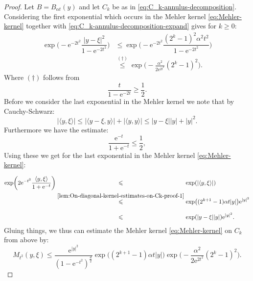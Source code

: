 \documentclass[a4paper,oneside,10pt]{amsproc}
\theoremstyle{remark}
\newcommand{\la}{\langle}
\newcommand{\ra}{\rangle}
\renewcommand{\leq}{\leqslant}
\renewcommand{\leq}{\leqslant}
\renewcommand{\geq}{\geqslant}
\newcommand{\e}{\mathrm{e}} %
\renewcommand{\leq}{\leqslant}%
\renewcommand{\geq}{\geqslant}%
\begin{document}
\begin{proof}
  Let $B = B_{\alpha t}(y)$ and let $C_k$ be as in
  \eqref{eq:C_k-annulus-decomposition}. Considering the first
  exponential which occurs in the Mehler kernel
  \eqref{eq:Mehler-kernel} together with
  \eqref{eq:C_k-annulus-decomposition-expand} gives for $k \geq 0$:
  \begin{align*}
    \exp\biggl(-\e^{-2t^2} \dfrac{|y - \xi|^2}{1 - \e^{-2t^2}} \biggr)
    &\leq \exp\biggl(-\e^{-2t^2} \dfrac{(2^k - 1)^2 \alpha^2 t^2}{1 - \e^{-2t^2}} \biggr)\\
    &\overset{(\dagger)}{\leq} \exp\biggl(-\frac{\alpha^2}{2 \e^{2t^2}} (2^k - 1)^2 \biggr).
  \end{align*}
  Where $(\dagger)$ follows from
  \begin{equation*}
    \frac{t}{1 - \e^{-2t}} \geq \frac12.
  \end{equation*}
  Before we consider the last exponential in the Mehler kernel we note
  that by Cauchy-Schwarz:
  \begin{equation}
    \label{lem:On-diagonal-kernel-estimates-on-Ck-proof-1}
    |\langle y, \xi \rangle| \leq |\la y - \xi, y \ra| + |\la y, y \ra|
    \leq |y - \xi||y| + |y|^2.
  \end{equation}
  Furthermore we have the estimate:
  \begin{equation*}
    \frac{\e^{-t}}{1 + \e^{-t}} \leq \frac12, 
  \end{equation*}
  Using these we get for the last exponential in the Mehler kernel
  \eqref{eq:Mehler-kernel}:
  \begin{align*}
    \exp\biggl(2\e^{-t^2} \dfrac{\la y, \xi \ra}{1 + \e^{-t}}
    \biggr)
    &\stackrel{\phantom{\eqref{lem:On-diagonal-kernel-estimates-on-Ck-proof-1}}}{\leq}
    \exp(|\la y, \xi \ra|)\\
    &\stackrel{\eqref{lem:On-diagonal-kernel-estimates-on-Ck-proof-1}}{\leq}
    \exp\bigl((2^{k + 1} - 1) \alpha t |y| \bigr) \e^{|y|^2}\\
    &\stackrel{\phantom{\eqref{lem:On-diagonal-kernel-estimates-on-Ck-proof-1}}}{\leq}
    \exp(|y - \xi||y|) \e^{|y|^2}.
  \end{align*}
  Gluing things, we thus can estimate the Mehler kernel
  \eqref{eq:Mehler-kernel} on $C_k$ from above by:
  \begin{equation*}
    M_{t^2}(y, \xi) \leq \frac{\e^{|y|^2}}{(1 - \e^{-{t^2}})^{\frac{d}2}}
    \exp\bigl((2^{k + 1} - 1) \alpha t |y| \bigr)
    \exp\biggl(-\frac{\alpha^2}{2 \e^{2t^2}} (2^k - 1)^2 \biggr). 
  \end{equation*}

\end{proof}
\end{document}
